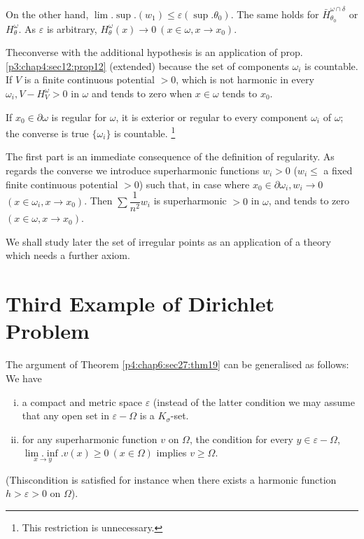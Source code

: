 On the other hand, $\lim. \sup. (w_1) \leq \varepsilon
(\sup. \theta_0)$. The same holds for $\bar{H}^{\omega \cap
  \delta}_{\theta_0}$ or $H^\omega_\theta$. As $\varepsilon$ is
arbitrary, $H^\omega_\theta (x) \to 0 ~(x \in \omega,  x \to x_0)$. 

The\pageoriginale converse with the additional hypothesis is an application of
prop. \ref{p3:chap4:sec12:prop12} (extended) because the set of
components $\omega_i$ is 
countable. If $V$ is a finite continuous potential $> 0$, which is not
harmonic in every $\omega_i,  V - H^\omega_V > 0$ in $\omega$ and
tends to zero when $x \in \omega$ tends to $x_0$. 

\begin{coro*}
  If $x_0 \in \partial \omega$ is regular for $\omega$, it is exterior
  or regular to every component $\omega_i$ of $\omega$; the converse
  is true $\big \{ \omega_i \big\}$ is  countable. \footnote{This
    restriction is unnecessary.} 
\end{coro*}

The first part is an immediate consequence of the definition of
regularity. As regards the converse we introduce superharmonic
functions $w_i > 0$ ($w_i \leq $ a fixed finite continuous potential $>
0$) such that, in case where $x_0 \in \partial \omega_i, w_i \to 0$
$(x \in \omega_i, x \to x_0)$. Then $\sum \dfrac{1}{n^2} w_i$ is
superharmonic $> 0$ in $\omega$, and tends to zero $(x \in \omega, x
\to x_0)$. 

We shall study later the set of irregular points as an application of
a theory which needs a further axiom. 

\section{Third Example of Dirichlet Problem}\label{p4:chap6:sec30}%

The argument of Theorem \ref{p4:chap6:sec27:thm19} can be generalised
as follows: We have 
\begin{enumerate}[(i)]
\item a compact and metric space $\varepsilon$ (instead of the latter
  condition we may assume that any open set in $\varepsilon - \Omega$
  is a $K_\sigma$-set. 
\item for any superharmonic function $v$ on $\Omega$, the condition
  for every $y \in \varepsilon - \Omega$, $\underset{x \to
    y}{\lim. \inf.} v(x) \geq 0 ~ (x \in \Omega)$ implies $v \geq
  \Omega$. 
\end{enumerate}
(This\pageoriginale condition is satisfied for instance when there exists a harmonic
function $h > \varepsilon > 0$ on $\Omega$). 

